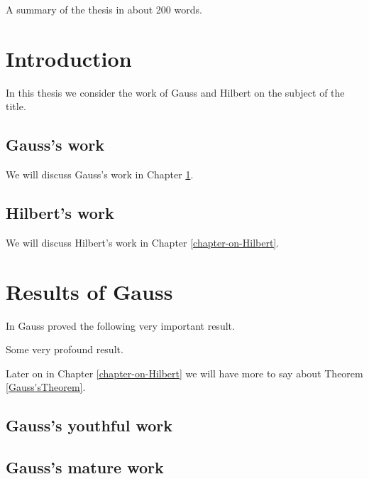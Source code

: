 \documentclass{report}
\begin{document}
A summary of the thesis in about 200 words.


\chapter*{Introduction}

In this thesis we consider the work of Gauss \cite[ch 2]{bib:Gauss}
and Hilbert \cite{bib:Hilbert1} on the subject of the title.


\section*{Gauss's work}

We will discuss Gauss's work in Chapter \ref{chapter-on-Gauss}.


\section*{Hilbert's work}

We will discuss Hilbert's work in Chapter \ref{chapter-on-Hilbert}.

\chapter{Results of Gauss}    \label{chapter-on-Gauss}

In \cite{bib:Gauss} Gauss proved the following very important result.

\begin{ttt}[Gauss]    \label{Gauss'sTheorem}
Some very profound result.
\end{ttt}


Later on in Chapter \ref{chapter-on-Hilbert}
we will have more to say about Theorem \ref{Gauss'sTheorem}.


\section{Gauss's youthful work}




\section{Gauss's mature work}
\end{document}
